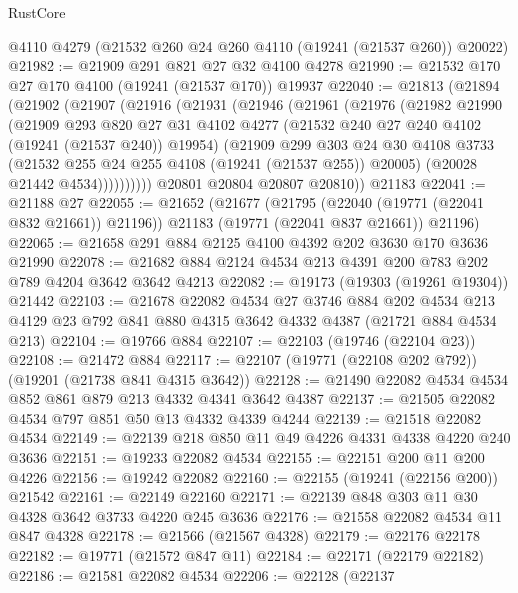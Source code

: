 \begin{lexlean}{RustCore}
\begin{coremodule}
    @4110
    @4279
    (@21532 @260 @24 @260 @4110 (@19241 (@21537 @260)) @20022)
@21982 := @21909 @291 @821 @27 @32 @4100 @4278
@21990 := @21532 @170 @27 @170 @4100 (@19241 (@21537 @170)) @19937
@22040 := @21813
    (@21894
      (@21902
        (@21907
          (@21916
            (@21931
              (@21946
                (@21961
                  (@21976
                    (@21982
                      @21990
                      (@21909
                        @293
                        @820
                        @27
                        @31
                        @4102
                        @4277
                        (@21532 @240 @27 @240 @4102 (@19241 (@21537 @240)) @19954)
                        (@21909
                          @299
                          @303
                          @24
                          @30
                          @4108
                          @3733
                          (@21532 @255 @24 @255 @4108 (@19241 (@21537 @255)) @20005)
                          (@20028 @21442 @4534))))))))))
        @20801
        @20804
        @20807
        @20810))
    @21183
@22041 := @21188 @27
@22055 := @21652
    (@21677
      (@21795 (@22040 (@19771 (@22041 @832 @21661)) @21196))
      @21183
      (@19771 (@22041 @837 @21661))
      @21196)
@22065 := @21658 @291 @884 @2125 @4100 @4392 @202 @3630 @170 @3636 @21990
@22078 := @21682 @884 @2124 @4534 @213 @4391 @200 @783 @202 @789 @4204 @3642 @3642 @4213
@22082 := @19173 (@19303 (@19261 @19304)) @21442
@22103 := @21678
    @22082
    @4534
    @27
    @3746
    @884
    @202
    @4534
    @213
    @4129
    @23
    @792
    @841
    @880
    @4315
    @3642
    @4332
    @4387
    (@21721 @884 @4534 @213)
@22104 := @19766 @884
@22107 := @22103 (@19746 (@22104 @23))
@22108 := @21472 @884
@22117 := @22107 (@19771 (@22108 @202 @792)) (@19201 (@21738 @841 @4315 @3642))
@22128 := @21490 @22082 @4534 @4534 @852 @861 @879 @213 @4332 @4341 @3642 @4387
@22137 := @21505 @22082 @4534 @797 @851 @50 @13 @4332 @4339 @4244
@22139 := @21518 @22082 @4534
@22149 := @22139 @218 @850 @11 @49 @4226 @4331 @4338 @4220 @240 @3636
@22151 := @19233 @22082 @4534
@22155 := @22151 @200 @11 @200 @4226
@22156 := @19242 @22082
@22160 := @22155 (@19241 (@22156 @200)) @21542
@22161 := @22149 @22160
@22171 := @22139 @848 @303 @11 @30 @4328 @3642 @3733 @4220 @245 @3636
@22176 := @21558 @22082 @4534 @11 @847 @4328
@22178 := @21566 (@21567 @4328)
@22179 := @22176 @22178
@22182 := @19771 (@21572 @847 @11)
@22184 := @22171 (@22179 @22182)
@22186 := @21581 @22082 @4534
@22206 := @22128
    (@22137

\end{coremodule}
\end{lexlean}
